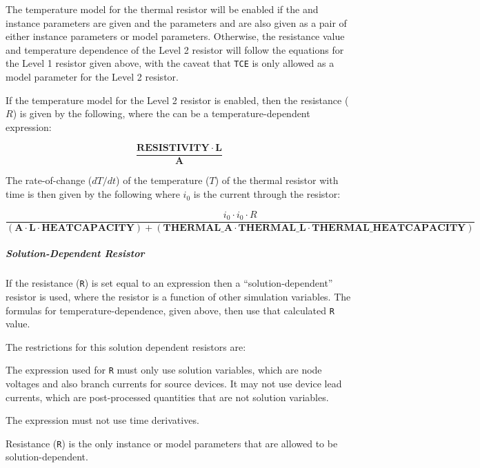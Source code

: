 The temperature model for the thermal resistor will be enabled
if the  and  instance parameters are 
given and the parameters  and
 are also given as a pair of either 
instance parameters or model parameters.  Otherwise, the
resistance value and temperature dependence of the Level 2
resistor will follow the equations for the Level 1 resistor 
given above, with the caveat that \texttt{TCE} is only 
allowed as a model parameter for the Level 2 resistor.

If the temperature model for the Level 2 resistor is enabled,
then the resistance ($R$) is given by the following, where the 
 can be a temperature-dependent expression:

\[
\frac{\mathbf{RESISTIVITY} \cdot \mathbf{L}}
{\mathbf{A}}
\]

The rate-of-change ($dT/dt$) of the temperature ($T$) of the 
thermal resistor with time is then given by the following where 
$i_{0}$ is the current through the resistor:

\[
\frac{i_{0} \cdot i_{0} \cdot R}
{(\mathbf{A} \cdot \mathbf{L} \cdot \mathbf{HEATCAPACITY}) +
 (\mathbf{THERMAL\_A} \cdot \mathbf{THERMAL\_L} \cdot \mathbf{THERMAL\_HEATCAPACITY})}
\]

\subparagraph{Solution-Dependent Resistor}
If the resistance (\texttt{R}) is set equal to an expression then a
``solution-dependent'' resistor is used, where the resistor is
a function of other simulation variables.  The formulas for
temperature-dependence, given above, then use that
calculated \texttt{R} value.

The restrictions for this solution dependent resistors are:
\begin{XyceItemize}
  \item The expression used for \texttt{R} must only use
    solution variables, which are node voltages and also branch
    currents for source devices.  It may not use device lead currents,
    which are post-processed quantities that are not solution variables.
  \item The expression must not use time derivatives.
  \item Resistance (\texttt{R}) is the only
    instance or model parameters that are allowed to be
    solution-dependent.
\end{XyceItemize}
